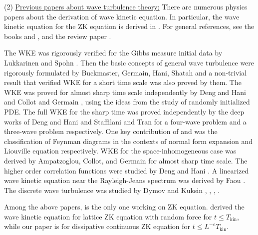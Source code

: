 (2) \underline{Previous papers about wave turbulence theory:} There are numerous physics papers about the derivation of wave kinetic equation. In particular, the wave kinetic equation for the ZK equation is derived in \cite{kuznetsov1972turbulence}. For general references, see the books \cite{zakharov2012kolmogorov} and \cite{nazarenko2011wave}, and the review paper \cite{newell2011wave}. 


The WKE was rigorously verified for the Gibbs measure initial data by Lukkarinen and Spohn \cite{lukkarinen2011weakly}. Then the basic concepts of general wave turbulence were rigorously formulated by Buckmaster, Germain, Hani, Shatah \cite{buckmaster2021onset} and a non-trivial result that verified WKE for a short time scale was also proved by them. The WKE was proved for almost sharp time scale independently by Deng and Hani \cite{deng2021derivation} and Collot and Germain \cite{collot2019derivation}, \cite{collot2020derivation} using the ideas from the study of randomly initialized PDE. The full WKE for the sharp time was proved independently by the deep works of Deng and Hani \cite{deng2021full} and Staffilani and Tran \cite{staffilani2021wave} for a four-wave problem and a three-wave problem respectively. One key contribution of \cite{deng2021full} and \cite{staffilani2021wave} was the classification of Feynman diagrams in the contexts of normal form expansion and Liouville equation respectively. WKE for the space-inhomogeneous case was derived by Ampatzoglou, Collot, and Germain \cite{ampatzoglou2021derivation} for almost sharp time scale. The higher order correlation functions were studied by Deng and Hani \cite{deng2021propagation}. A linearized wave kinetic equation near the Rayleigh-Jeans spectrum was derived by Faou \cite{faou2020linearized}. The discrete wave turbulence was studied by Dymov and Kuksin \cite{dymov2021formal}, \cite{dymov2020zakharov}, \cite{dymov2023formal}, \cite{dymov2021large}.
 

Among the above papers, \cite{staffilani2021wave} is the only one working on ZK equation. \cite{staffilani2021wave} derived the wave kinetic equation for lattice ZK equation with random force for $t\le T_{\text{kin}}$, while our paper is for dissipative continuous ZK equation for $t\le L^{-\varepsilon}T_{\text{kin}}$.

